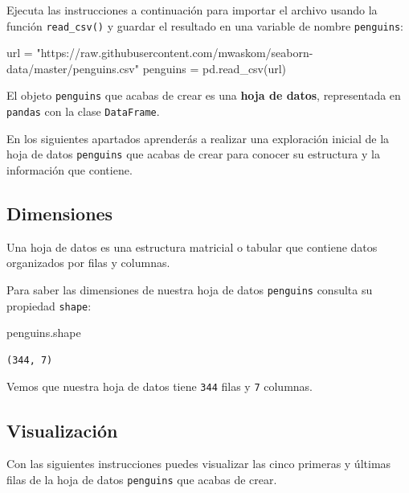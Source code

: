 \documentclass[
  a4paper,
  noprof,
  12pt,
  notoc,
  nosols,
  nobib]{mnye}
\newenvironment{Shaded}{\begin{snugshade}}{\end{snugshade}}
\newcommand{\NormalTok}[1]{\textcolor[rgb]{0.00,0.23,0.31}{#1}}
\newcommand{\OperatorTok}[1]{\textcolor[rgb]{0.37,0.37,0.37}{#1}}
\newcommand{\StringTok}[1]{\textcolor[rgb]{0.13,0.47,0.30}{#1}}
\theoremstyle{definition}
\theoremstyle{remark}
\begin{document}
Ejecuta las instrucciones a continuación para importar el archivo usando
la función \texttt{read\_csv()} y guardar el resultado en una variable
de nombre \texttt{penguins}:

\begin{Shaded}
\begin{Highlighting}[]
\NormalTok{url }\OperatorTok{=} \StringTok{"https://raw.githubusercontent.com/mwaskom/seaborn{-}data/master/penguins.csv"}
\NormalTok{penguins }\OperatorTok{=}\NormalTok{ pd.read\_csv(url)}
\end{Highlighting}
\end{Shaded}

El objeto \texttt{penguins} que acabas de crear es una \textbf{hoja de
datos}, representada en \texttt{pandas} con la clase \texttt{DataFrame}.

En los siguientes apartados aprenderás a realizar una exploración
inicial de la hoja de datos \texttt{penguins} que acabas de crear para
conocer su estructura y la información que contiene.

\hypertarget{dimensiones}{%
\subsection{Dimensiones}\label{dimensiones}}

Una hoja de datos es una estructura matricial o tabular que contiene
datos organizados por filas y columnas.

Para saber las dimensiones de nuestra hoja de datos \texttt{penguins}
consulta su propiedad \texttt{shape}:

\begin{Shaded}
\begin{Highlighting}[]
\NormalTok{penguins.shape}
\end{Highlighting}
\end{Shaded}

\begin{verbatim}
(344, 7)
\end{verbatim}

Vemos que nuestra hoja de datos tiene \texttt{344} filas y \texttt{7}
columnas.

\hypertarget{visualizaciuxf3n}{%
\subsection{Visualización}\label{visualizaciuxf3n}}

Con las siguientes instrucciones puedes visualizar las cinco primeras y
últimas filas de la hoja de datos \texttt{penguins} que acabas de crear.
\end{document}
